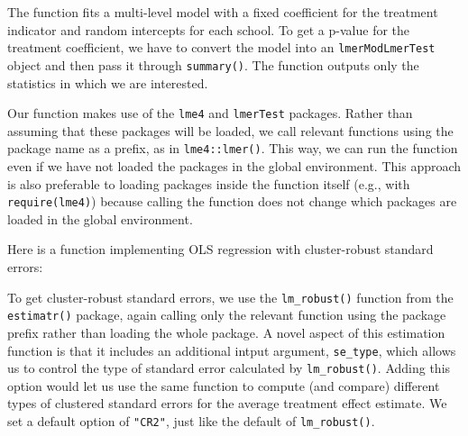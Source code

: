 \documentclass[
]{book}
\newenvironment{Shaded}{\begin{snugshade}}{\end{snugshade}}
\newcommand{\AttributeTok}[1]{\textcolor[rgb]{0.13,0.29,0.53}{#1}}
\newcommand{\ControlFlowTok}[1]{\textcolor[rgb]{0.13,0.29,0.53}{\textbf{#1}}}
\newcommand{\DecValTok}[1]{\textcolor[rgb]{0.00,0.00,0.81}{#1}}
\newcommand{\FunctionTok}[1]{\textcolor[rgb]{0.13,0.29,0.53}{\textbf{#1}}}
\newcommand{\NormalTok}[1]{#1}
\newcommand{\OtherTok}[1]{\textcolor[rgb]{0.56,0.35,0.01}{#1}}
\newcommand{\SpecialCharTok}[1]{\textcolor[rgb]{0.81,0.36,0.00}{\textbf{#1}}}
\newcommand{\StringTok}[1]{\textcolor[rgb]{0.31,0.60,0.02}{#1}}
\begin{document}
The function fits a multi-level model with a fixed coefficient for the treatment indicator and random intercepts for each school.
To get a p-value for the treatment coefficient, we have to convert the model into an \texttt{lmerModLmerTest} object and then pass it through \texttt{summary()}.
The function outputs only the statistics in which we are interested.

Our function makes use of the \texttt{lme4} and \texttt{lmerTest} packages.
Rather than assuming that these packages will be loaded, we call relevant functions using the package name as a prefix, as in \texttt{lme4::lmer()}.
This way, we can run the function even if we have not loaded the packages in the global environment.
This approach is also preferable to loading packages inside the function itself (e.g., with \texttt{require(lme4)}) because calling the function does not change which packages are loaded in the global environment.

Here is a function implementing OLS regression with cluster-robust standard errors:

\begin{Shaded}
\end{Shaded}

To get cluster-robust standard errors, we use the \texttt{lm\_robust()} function from the \texttt{estimatr()} package, again calling only the relevant function using the package prefix rather than loading the whole package.
A novel aspect of this estimation function is that it includes an additional intput argument, \texttt{se\_type}, which allows us to control the type of standard error calculated by \texttt{lm\_robust()}.
Adding this option would let us use the same function to compute (and compare) different types of clustered standard errors for the average treatment effect estimate.
We set a default option of \texttt{"CR2"}, just like the default of \texttt{lm\_robust()}.
\end{document}
